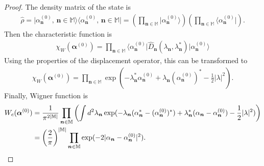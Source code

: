 \documentclass[12pt,aip,jmp,amssymb,amsmath]{revtex4-1}
\begin{document}
\begin{proof}
The density matrix of the state is
\begin{eqnarray}
    \hat{\rho}
    = \vert \alpha_{\boldsymbol{n}}^{(0)},\, \boldsymbol{n} \in \mathbb{M} \rangle
        \langle \alpha_{\boldsymbol{n}}^{(0)},\, \boldsymbol{n} \in \mathbb{M} \vert
    = \left( \prod_{\boldsymbol{n} \in \mathbb{M}} \vert \alpha_{\boldsymbol{n}}^{(0)} \rangle \right)
        \left( \prod_{\boldsymbol{n} \in \mathbb{M}} \langle \alpha_{\boldsymbol{n}}^{(0)} \vert \right).
\end{eqnarray}
Then the characteristic function is
\begin{eqnarray}
    \chi_W (\boldsymbol{\alpha}^{(0)})
    = \prod_{\boldsymbol{n} \in \mathbb{M}}
        \langle \alpha_{\boldsymbol{n}}^{(0)} \vert
        \hat{D}_{\boldsymbol{n}} (\lambda_{\boldsymbol{n}}, \lambda_{\boldsymbol{n}}^*)
        \vert \alpha_{\boldsymbol{n}}^{(0)} \rangle
\end{eqnarray}
Using the properties of the displacement operator, this can be transformed to
\begin{eqnarray}
    \chi_W (\boldsymbol{\alpha}^{(0)})
    = \prod_{\boldsymbol{n} \in \mathbb{M}}
        \exp(
            - \lambda_{\boldsymbol{n}}^* \alpha_{\boldsymbol{n}}^{(0)}
            + \lambda_{\boldsymbol{n}} (\alpha_{\boldsymbol{n}}^{(0)})^*
            - \frac{1}{2} |\lambda|^2
        ).
\end{eqnarray}
Finally, Wigner function is
\begin{eqnarray}
    W_c (\boldsymbol{\alpha}^{(0)})
    & = \frac{1}{\pi^{2|\mathbb{M}|}} \prod_{\boldsymbol{n} \in \mathbb{M}} \left(
        \int d^2\lambda_{\boldsymbol{n}}
            \exp(
                - \lambda_{\boldsymbol{n}} (\alpha_{\boldsymbol{n}}^* - (\alpha_{\boldsymbol{n}}^{(0)})^*)
                + \lambda_{\boldsymbol{n}}^* (\alpha_{\boldsymbol{n}} - \alpha_{\boldsymbol{n}}^{(0)})
                - \frac{1}{2} |\lambda|^2
            )
    \right) \\
    & = \left( \frac{2}{\pi} \right)^{|\mathbb{M}|} \prod_{\boldsymbol{n} \in \mathbb{M}}
        \exp(-2 |\alpha_{\boldsymbol{n}} - \alpha_{\boldsymbol{n}}^{(0)}|^2).
    \qedhere
\end{eqnarray}
\end{proof}
\end{document}
